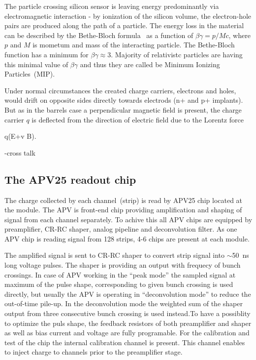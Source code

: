 The particle crossing silicon sensor is leaving energy predominantly via electromagnetic interaction - by ionization of the silicon volume, the electron-hole pairs are produced along the path of a particle. The energy loss in the material can be described by the Bethe-Bloch formula~\cite{Groom:2000sm} as a function of $\beta\gamma = p/Mc$, where $p$ and $M$ is mometum and mass of the interacting particle. The Bethe-Bloch function has a minimum for $\beta\gamma \approx 3$. Majority of relativistc particles are having this minimal value of $\beta\gamma$ and thus they are called be Minimum Ionizing Particles~(MIP).

Under normal circumstances the created charge carriers, electrons and holes, would drift on opposite sides directly towards electrods (n+ and p+ implants). But as in the barrels case a perpendicular magnetic field is present, the charge carrier $q$ is deflected from the direction of electric field due to the Lorentz force

{
    q(E+v \times B).
}


-cross talk

\subsection{The APV25 readout chip}

The charge collected by each channel~(strip) is read by APV25 chip located at the module. The APV is front-end chip providing amplification and shaping of signal from each channel separately. To achive this all APV chips are equipped by preamplifier, CR-RC shaper, analog pipeline and deconvolution filter. As one APV chip is reading signal from 128 strips, 4-6 chips are present at each module.

The amplified signal is sent to CR-RC shaper to convert strip signal into $\sim$50~ns long voltage pulses. The shaper is providing an output with frequecy of bunch crossings. In case of APV working in the ``peak mode'' the sampled signal at maximum of the pulse shape, corresponding to given bunch crossing is used directly, but usually the APV is operating in ``deconvolution mode'' to reduce the out-of-time pile-up. In the deconvolution mode the weighted sum of the shaper output from three consecutive bunch crossing is used instead.To have a possiblity to optimize the puls shape, the feedback resistors of both preamplifier and shaper as well as  bias current and voltage are fully programable. For the calibration and test of the chip the internal calibration channel is present. This channel enables to inject charge to channels prior to the preamplifier stage.

